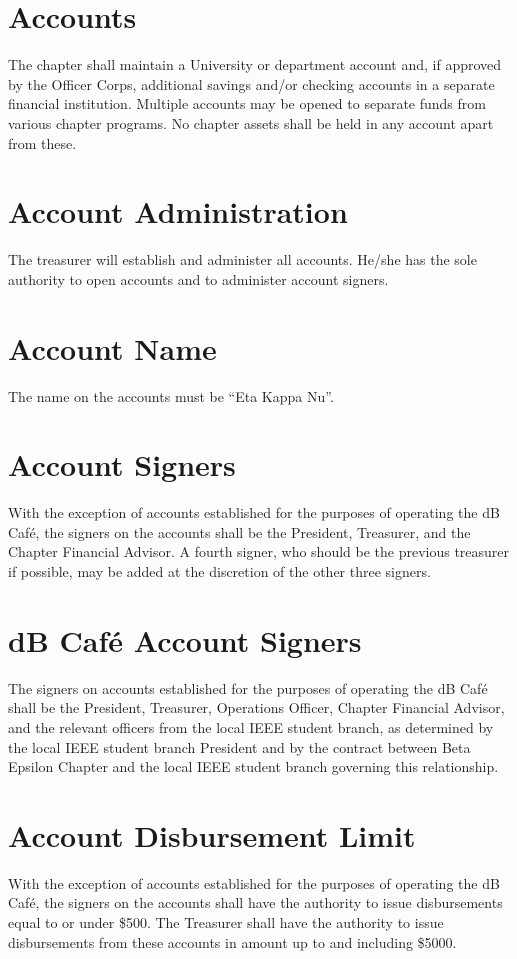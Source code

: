 
\section{Accounts}
The chapter shall maintain a University or department account and, if approved by the Officer Corps, additional savings and/or checking accounts in a separate financial institution. Multiple accounts may be opened to separate funds from various chapter programs. No chapter assets shall be held in any account apart from these.

\section{Account Administration}
The treasurer will establish and administer all accounts. He/she has the sole authority to open accounts and to administer account signers.


\section{Account Name}
The name on the accounts must be ``Eta Kappa Nu''.

\section{\hkn Account Signers}
With the exception of accounts established for the purposes of operating the dB Caf\'{e}, the signers on the accounts shall be the President, Treasurer, and the Chapter Financial Advisor. A fourth signer, who should be the previous treasurer if possible, may be added at the discretion of the other three signers.

\section{dB Caf\'{e} Account Signers}
The signers on accounts established for the purposes of operating the dB Caf\'{e} shall be the President, Treasurer, Operations Officer, Chapter Financial Advisor, and the relevant officers from the local IEEE student branch, as determined by the local IEEE student branch President and by the contract between \hkn Beta Epsilon Chapter and the local IEEE student branch governing this relationship.

\section{\hkn Account Disbursement Limit}
With the exception of accounts established for the purposes of operating the dB Caf\'{e}, the signers on the accounts shall have the authority to issue disbursements equal to or under \$500. The Treasurer shall have the authority to issue disbursements from these accounts in amount up to and including \$5000.

